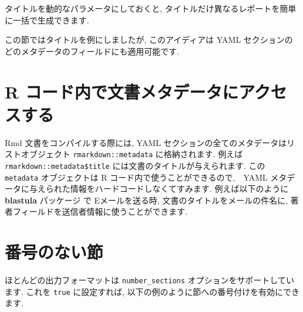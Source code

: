 \documentclass[
  11pt,
  lualatex,
  ja=standard]{bxjsreport}
\newenvironment{Shaded}{\begin{snugshade}}{\end{snugshade}}
\newcommand{\AnnotationTok}[1]{\textcolor[rgb]{0.56,0.35,0.01}{\textbf{\textit{#1}}}}
\newcommand{\CommentTok}[1]{\textcolor[rgb]{0.56,0.35,0.01}{\textit{#1}}}
\newcommand{\InformationTok}[1]{\textcolor[rgb]{0.56,0.35,0.01}{\textbf{\textit{#1}}}}
\newcommand{\NormalTok}[1]{#1}
\begin{document}
タイトルを動的なパラメータにしておくと, タイトルだけ異なるレポートを簡単に一括で生成できます.

この節ではタイトルを例にしましたが, このアイディアは YAML セクションのどのメタデータのフィールドにも適用可能です.

\hypertarget{document-metadata}{%
\section{R コード内で文書メタデータにアクセスする}\label{document-metadata}}

Rmd 文書をコンパイルする際には, YAML セクションの全てのメタデータはリストオブジェクト \texttt{rmarkdown::metadata} に格納されます. 例えば \texttt{rmarkdown::metadata\$title} には文書のタイトルが与えられます. この \texttt{metadata} オブジェクトは R コード内で使うことができるので,　YAML メタデータに与えられた情報をハードコードしなくてすみます. 例えば以下のように \textbf{blastula} パッケージ \autocite{R-blastula} で Eメールを送る時, 文書のタイトルをメールの件名に, 著者フィールドを送信者情報に使うことができます.

\begin{Shaded}
\end{Shaded}

\hypertarget{unnumbered-sections}{%
\section{番号のない節}\label{unnumbered-sections}}

ほとんどの出力フォーマットは \texttt{number\_sections} オプションをサポートしています. これを \texttt{true} に設定すれば, 以下の例のように節への番号付けを有効にできます.
\end{document}
